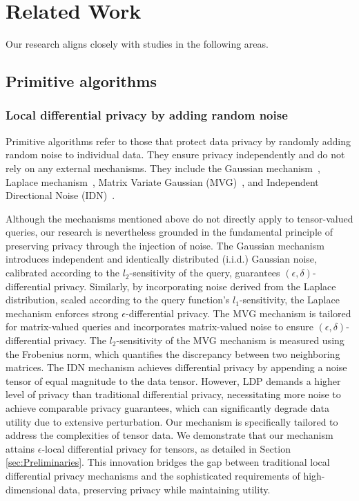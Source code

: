 \section{Related Work}
\label{sec:RelatedWork}
Our research aligns closely with studies in the following areas.
\subsection{Primitive algorithms}
\subsubsection{Local differential privacy by adding random noise}
Primitive algorithms refer to those that protect data privacy by randomly adding random noise to individual data. They ensure privacy independently and do not rely on any external mechanisms. They include the Gaussian mechanism~\cite{dwork2014algorithmic}, Laplace mechanism~\cite{dwork2006calibrating}, Matrix Variate Gaussian (MVG)~\cite{chanyaswad2018mvg}, and Independent Directional Noise (IDN)~\cite{direction}.

Although the mechanisms mentioned above do not directly apply to tensor-valued queries, our research is nevertheless grounded in the fundamental principle of preserving privacy through the injection of noise.
The Gaussian mechanism introduces independent and identically distributed (i.i.d.) Gaussian noise, calibrated according to the $l_2$-sensitivity of the query, guarantees $(\epsilon, \delta)$-differential privacy. Similarly, by incorporating noise derived from the Laplace distribution, scaled according to the query function's $l_1$-sensitivity, the Laplace mechanism enforces strong $\epsilon$-differential privacy. 
The MVG mechanism is tailored for matrix-valued queries and incorporates matrix-valued noise to ensure $(\epsilon, \delta)$-differential privacy. The $l_2$-sensitivity of the MVG mechanism is measured using the Frobenius norm, which quantifies the discrepancy between two neighboring matrices. 
The IDN mechanism achieves differential privacy by appending a noise tensor of equal magnitude to the data tensor. However, LDP demands a higher level of privacy than traditional differential privacy, necessitating more noise to achieve comparable privacy guarantees, which can significantly degrade data utility due to extensive perturbation.
Our mechanism is specifically tailored to address the complexities of tensor data. We demonstrate that our mechanism attains $\epsilon$-local differential privacy for tensors, as detailed in Section \ref{sec:Preliminaries}. This innovation bridges the gap between traditional local differential privacy mechanisms and the sophisticated requirements of high-dimensional data, preserving privacy while maintaining utility. 

